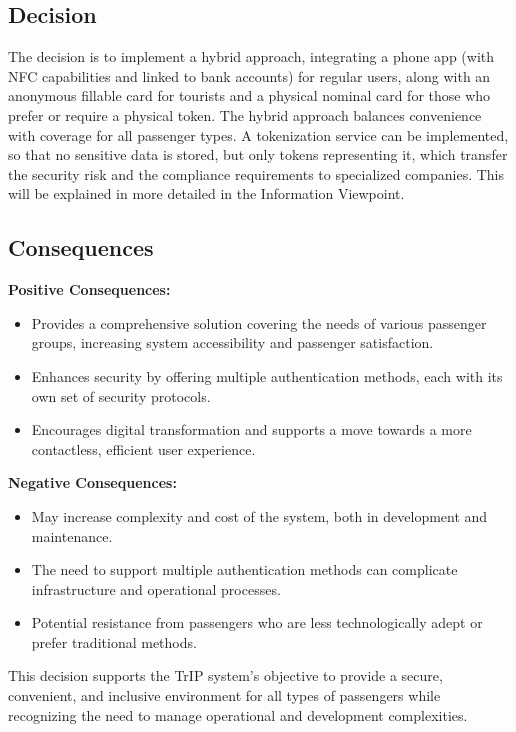 \subsection*{Decision}
The decision is to implement a hybrid approach, integrating a phone app (with NFC capabilities and linked to bank accounts) for regular users, along with an anonymous fillable card for tourists and a physical nominal card for those who prefer or require a physical token. The hybrid approach balances convenience with coverage for all passenger types.
A tokenization service can be implemented, so that no sensitive data is stored, but only tokens representing it, which transfer the security risk and the compliance requirements to specialized companies.
This will be explained in more detailed in the Information Viewpoint.

\subsection*{Consequences}
\textbf{Positive Consequences:}
\begin{itemize}
    \item Provides a comprehensive solution covering the needs of various passenger groups, increasing system accessibility and passenger satisfaction.
    \item Enhances security by offering multiple authentication methods, each with its own set of security protocols.
    \item Encourages digital transformation and supports a move towards a more contactless, efficient user experience.
\end{itemize}
\textbf{Negative Consequences:}
\begin{itemize}
    \item May increase complexity and cost of the system, both in development and maintenance.
    \item The need to support multiple authentication methods can complicate infrastructure and operational processes.
    \item Potential resistance from passengers who are less technologically adept or prefer traditional methods.
\end{itemize}
This decision supports the TrIP system's objective to provide a secure, convenient, and inclusive environment for all types of passengers while recognizing the need to manage operational and development complexities.
